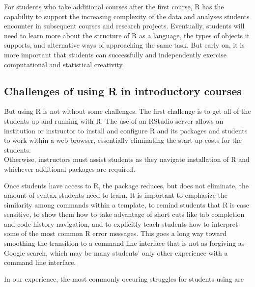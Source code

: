 For students who take additional courses after the first course, R has
the capability to support the increasing complexity of the data and
analyses students encounter in subsequent courses and research projects.
Eventually, students will need to learn more about the structure of R as
a language, the types of objects it supports, and alternative ways of
approaching the same task. But early on, it is more important that
students can successfully and independently exercise computational and
statistical creativity.

\subsection{Challenges of using R in introductory
courses}\label{challenges-of-using-r-in-introductory-courses}

But using R is not without some challenges. The first challenge is to
get all of the students up and running with R. The use of an RStudio
server allows an institution or instructor to install and configure R
and its packages and students to work within a web browser, essentially
eliminating the start-up costs for the students.\\
Otherwise, instructors must assist students as they navigate
installation of R and whichever additional packages are required.

Once students have access to R, the  package reduces, but
does not eliminate, the amount of syntax students need to learn. It is
important to emphasize the similarity among commands within a template,
to remind students that R is case sensitive, to show them how to take
advantage of short cuts like tab completion and code history navigation,
and to explicitly teach students how to interpret some of the most
common R error messages. This goes a long way toward smoothing the
transition to a command line interface that is not as forgiving as
Google search, which may be many students' only other experience with a
command line interface.

In our experience, the most commonly occuring struggles for students
using  are

